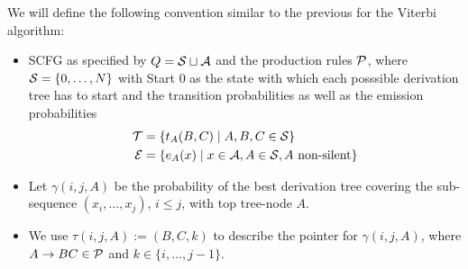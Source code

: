 We will define the following convention similar to the previous for the Viterbi
algorithm:
\begin{itemize}
\item SCFG as specified by \(Q=\mathcal{S}\sqcup\mathcal{A}\) and the
  production rules \(\mathcal{P}\), where \(\mathcal{S}=\{0,\dotsc,N\}\) with Start \(0\)
  as the state with which each posssible derivation tree has to start and the
  transition probabilities as well as the emission probabilities
  \begin{align*}
    \mathcal{T} &=\{t_A(B,C) \mid A,B,C\in\mathcal{S}\} \\
    \mathcal{E}&=\{e_A(x) \mid x\in\mathcal{A}, A\in\mathcal{S}, A\text{ non-silent} \}
  \end{align*}
\item Let \(\gamma(i,j,A)\) be the probability of the
  best derivation tree covering the sub-sequence \((x_i,\dotsc,x_j)\),
  \(i\leq j\), with top tree-node \(A\).
\item We use \(\tau(i,j,A):=(B,C,k)\) to describe the pointer for
  \(\gamma(i,j,A)\), where \(A\to BC\in\mathcal{P}\) and \(k\in\{i,\dotsc,j-1\}\).
\end{itemize}

